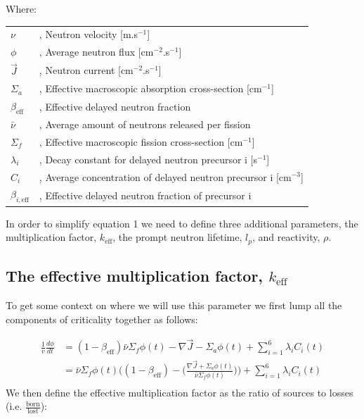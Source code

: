 \documentclass[11pt,letterpaper,titlepage]{article}
\begin{document}
\noindent
Where:\newline
\begin{tabular}{ m{0.75cm}  m{13cm}  }
		$\nu$  &, Neutron velocity [m.s$^{-1}$]        \\ 
		$\phi$ &, Average neutron flux [cm$^{-2}$.s$^{-1}$]   \\ 
		$\vec{J}$ &, Neutron current [cm$^{-2}$.s$^{-1}$] \\
		$\Sigma_a$ &, Effective macroscopic absorption cross-section [cm$^{-1}$] \\
		$\beta_{\mathrm{eff}}$ &, Effective delayed neutron fraction \\
		$\bar{\nu}$ &, Average amount of neutrons released per fission \\
		$\Sigma_f$ &, Effective macroscopic fission cross-section [cm$^{-1}$] \\
		$\lambda_i$ &, Decay constant for delayed neutron precursor i [s$^{-1}$] \\
		$C_i$ &, Average concentration of delayed neutron precursor i [cm$^{-3}$] \\
		$\beta_{i,\mathrm{eff}}$ &, Effective delayed neutron fraction of precursor i \\
\end{tabular} 
\newline
\newline
\newline
\noindent
In order to simplify equation 1 we need to define three additional parameters, the multiplication factor, $k_{\mathrm{eff}}$, the prompt neutron lifetime, $l_p$, and reactivity, $\rho$.

\subsection{The effective multiplication factor, $k_{\mathrm{eff}}$}

To get some context on where we will use this parameter we first lump all the components of criticality together as follows:

\begin{equation}
\begin{aligned}
	\frac{1}{v}\frac{d\phi}{dt} &= (1-\beta_{\mathrm{eff}})\bar{\nu} \Sigma_f \phi (t) -\nabla \vec{J} - \Sigma_a \phi(t)+ \sum_{i=1}^6 \lambda_i C_i (t) \\
	 &= \bar{\nu} \Sigma_f \phi (t)\biggr((1-\beta_{\mathrm{eff}})-\biggr(\frac{\nabla \vec{J} + \Sigma_a \phi(t)}{\bar{\nu} \Sigma_f \phi (t)}\biggr)\biggr) + \sum_{i=1}^6 \lambda_i C_i (t) \\
\end{aligned}
\end{equation}
We then define the effective multiplication factor as the ratio of sources to losses (i.e. $\frac{\mathrm{born}}{\mathrm{lost}}$):
\end{document}
